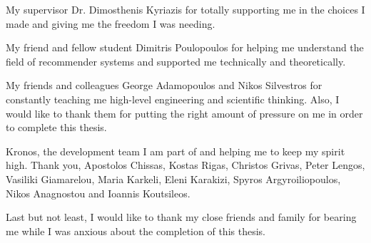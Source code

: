 \documentclass[10pt,journal]{IEEEtran}
\begin{document}
My supervisor Dr. Dimosthenis Kyriazis for totally supporting me in the choices I made and giving me the freedom I was needing.

My friend and fellow student Dimitris Poulopoulos for helping me understand the field of recommender systems and supported me technically and theoretically.

My friends and colleagues George Adamopoulos and Nikos Silvestros for constantly teaching me high-level engineering and scientific thinking. Also, I would like to thank them for putting the right amount of pressure on me in order to complete this thesis.

Kronos, the development team I am part of and helping me to keep my spirit high. Thank you, Apostolos Chissas, Kostas Rigas, Christos Grivas, Peter Lengos, Vasiliki Giamarelou, Maria Karkeli, Eleni Karakizi, Spyros Argyroiliopoulos, Nikos Anagnostou and Ioannis Koutsileos. 

Last but not least, I would like to thank my close friends and family for bearing me while I was anxious about the completion of this thesis.
	
	
	
\end{document}
